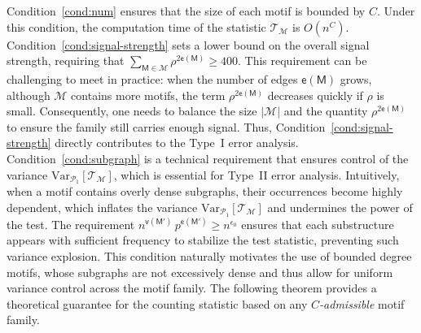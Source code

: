 \documentclass[letterpaper,11pt]{article}
\theoremstyle{definition}
\newcommand{\maM}{\mathcal{M}}
\newcommand{\maP}{\mathcal{P}}
\newcommand{\maT}{\mathcal{T}}
\newcommand{\en}{\mathsf{{e}}}
\newcommand{\vn}{\mathsf{{v}}}
\newcommand{\qth}[1]{\left[ #1 \right]}
\newcommand{\sfM}{{\mathsf{M}}}
\def\var{\mathrm{Var}}
\def\E{\mathbb{E}}
\begin{document}
Condition~\ref{cond:num} ensures that the size of each motif is bounded by $C$. Under this condition, the computation time of the statistic $\maT_\maM$ is $O(n^{C})$. 
Condition~\ref{cond:signal-strength} sets a lower bound on the overall signal strength, requiring that $\sum_{\sfM\in \maM} \rho^{2\en(\sfM)}\ge 400$. This requirement can be challenging to meet in practice: when the number of edges $\en(\sfM)$ grows, although $\maM$ contains more motifs, the term $\rho^{2\en(\sfM)}$ decreases quickly if $\rho$ is small. Consequently, one needs to balance the size $|\maM|$ and the quantity $\rho^{2\en(\sfM)}$ to ensure the family still carries enough signal.
Thus, Condition~\ref{cond:signal-strength} directly contributes to the Type~I error analysis.
Condition~\ref{cond:subgraph} is a technical requirement that ensures control of the variance $\var_{\maP_1}[\maT_\maM]$, which is essential for Type~II error analysis.
Intuitively, when a motif contains overly dense subgraphs, their occurrences become highly dependent, which inflates the variance $\var_{\maP_1}\!\left[\maT_\maM\right]$ and undermines the power of the test.
The requirement
\(
n^{\vn(\sfM')}\, p^{\en(\sfM')}\ge n^{\epsilon_0}
\)
ensures that each substructure appears with sufficient frequency to stabilize the test statistic, preventing such variance explosion.
This condition naturally motivates the use of bounded degree motifs, whose subgraphs are not excessively dense and thus allow for uniform variance control across the motif family.
The following theorem provides a theoretical guarantee for the counting statistic based on any \emph{$C$-admissible} motif family.


\end{document}
